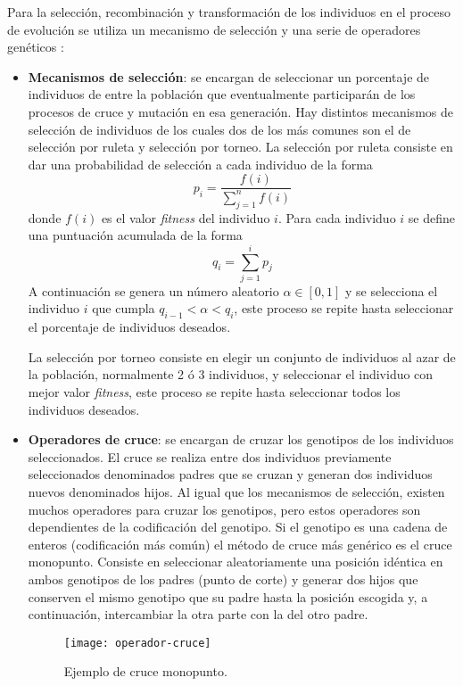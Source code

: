 Para la selección, recombinación y transformación de los individuos en el proceso de evolución se utiliza un mecanismo de selección y una serie de operadores genéticos \cite{cervigon09}:

\begin{itemize}
\item \textbf{Mecanismos de selección}: se encargan  de seleccionar un porcentaje de individuos de entre la población que eventualmente participarán de los procesos de cruce y mutación en esa generación. Hay distintos mecanismos de selección de individuos de los cuales dos de los más comunes son el de selección por ruleta y selección por torneo. La selección por ruleta consiste en dar una probabilidad de selección a cada individuo de la forma
\begin{equation*}
p_i = \frac{f(i)}{\sum\limits_{j=1}^n f(i)}
\end{equation*}
donde $f(i)$ es el valor \textit{fitness} del individuo $i$. Para cada individuo $i$ se define una puntuación acumulada de la forma
\begin{equation*}
q_i = \sum\limits_{j=1}^i p_j
\end{equation*}
A continuación se genera un número aleatorio $\alpha \in [0,1]$ y se selecciona el individuo $i$ que cumpla $q_{i-1} < \alpha < q_i$, este proceso se repite hasta seleccionar el porcentaje de individuos deseados. 

La selección por torneo consiste en elegir un conjunto de individuos al azar de la población, normalmente 2 ó 3 individuos, y seleccionar el individuo con mejor valor \textit{fitness}, este proceso se repite hasta seleccionar todos los individuos deseados.

\item \textbf{Operadores de cruce}: se encargan de cruzar los genotipos de los individuos seleccionados. El cruce se realiza entre dos individuos previamente seleccionados denominados padres que se cruzan y generan dos individuos nuevos denominados hijos. Al igual que los mecanismos de selección, existen muchos operadores  para cruzar los genotipos, pero estos operadores son dependientes de la codificación del genotipo. Si el genotipo es una cadena de enteros (codificación más común) el método de cruce más genérico es el cruce monopunto. Consiste en seleccionar aleatoriamente una posición idéntica en ambos genotipos de los padres (punto de corte) y generar dos hijos que conserven el mismo genotipo que su padre hasta la posición escogida y, a continuación, intercambiar la otra parte con la del otro padre.
\begin{figure}[H]
\centering
\texttt{[image: operador-cruce]}
\caption{Ejemplo de cruce monopunto.}
\end{figure}


\end{itemize}
